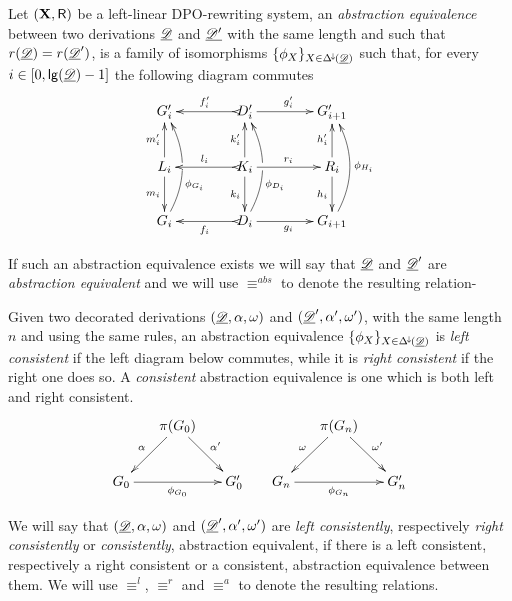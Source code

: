 \begin{definition}Let $(\textbf {\textup{X}}, \mathsf{R})$ be a left-linear DPO-rewriting system,  an \emph{abstraction equivalence} between two derivations $\underline{\mathscr{D}}$ and $\underline{\mathscr{D'}}$ with the same length and such that $r(\underline{\mathscr{D}})=r(\underline{\mathscr{D}}')$, is a family of isomorphisms $\{\phi_X\}_{X\in \Delta^{\hspace{-1pt}\downarrow\hspace{-1pt}}(\underline{\mathscr{D}})}$ such that, for every $i\in [0, \mathsf{lg}(\underline{\mathscr{D}})-1]$ the following diagram commutes
	\[\xymatrix@C=40pt{G'_i&D'_i \ar[r]^{g'_i} \ar@{>->}[l]_{f'_i}&G'_{i+1}\\  L_i \ar[u]^{m'_i} \ar[d]_{m_i}& K_i \ar[u]^{k'_i} \ar[d]_{k_i} \ar[r]^{r_i} \ar@{>->}[l]_{l_i} &R_i\ar[u]^{h'_i} \ar[d]_{h_i}\\G_i \ar@/_.45cm/[uu]_(.35){\phi_{G_i}}|\hole&D_i\ar@{>->}[l]^{f_i}\ar@/_.45cm/[uu]_(.35){\phi_{D_i}}|\hole \ar[r]_{g_i}&G_{i+1}\ar@/_.45cm/[uu]_{\phi_{H_i}}}\]
	
	If such an abstraction equivalence exists we will say that $\underline{\mathscr{D}}$ and $\underline{\mathscr{D}}'$ are \emph{abstraction equivalent} and we will use $\equiv^{abs}$ to denote the resulting relation-
	
Given two decorated derivations $(\underline{\mathscr{D}}, \alpha, \omega)$  and $(\underline{\mathscr{D}}', \alpha', \omega')$, with the same length $n$ and using the same rules, an abstraction equivalence $\{\phi_X\}_{X\in \Delta^{\hspace{-1pt}\downarrow\hspace{-1pt}}(\underline{\mathscr{D}})}$ is \emph{left consistent} if the left diagram below commutes, while it is \emph{right consistent} if the right one does so. A \emph{consistent} abstraction equivalence  is one which is both left and right consistent.
\[\xymatrix@C=15pt{&\pi(G_0) \ar[dr]^{\alpha'} \ar[dl]_{\alpha}&&& \pi(G_{n}) \ar[dr]^{\omega'} \ar[dl]_{\omega}\\ G_0 \ar[rr]_{\phi_{G_0}} && G'_0 &G_{n} \ar[rr]_{\phi_{G_{n}}} && G'_{n} } \]
	
We will say that $(\underline{\mathscr{D}}, \alpha, \omega)$  and $(\underline{\mathscr{D}}', \alpha', \omega')$ are \emph{left consistently}, respectively \emph{right consistently} or \emph{consistently}, abstraction equivalent, if there is a left consistent, respectively a right consistent or a consistent, abstraction equivalence between them. We will use $\equiv^{l}$, $\equiv^{r}$ and $\equiv^{a}$ to denote the resulting relations.
\end{definition}

